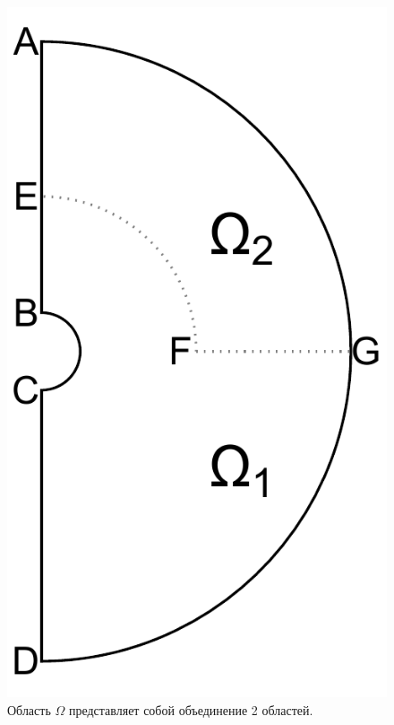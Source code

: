 \begin{figure}[!htb]
\centering
\includegraphics[scale=0.3]{images/ch4/section3_circular/domain.pdf}
    \caption{Область $\Omega$ представляет собой объединение 2 областей.}
    \label{fig:pt10:_domain}
\end{figure}


